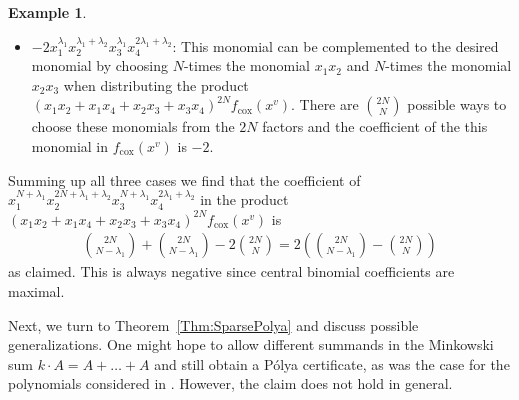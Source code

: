 \documentclass[a4paper,11pt]{amsart}
\theoremstyle{definition}
\newtheorem{example}[theorem]{Example}
\newcommand{\cox}{\mathrm{cox}}
\begin{document}
\begin{example}
\begin{itemize}
    \item {$- 2 x_1^{\lambda_1}x_2^{\lambda_1 + \lambda_2}x_3^{\lambda_1}x_4^{2\lambda_1 + \lambda_2}$:} This monomial can be complemented to the desired monomial by choosing $N$-times the monomial $x_1x_2$ and $N$-times the monomial $x_2x_3$ when distributing the product $(x_1x_2+x_1x_4+x_2x_3+x_3x_4)^{2N}f_\cox(x^v)$. There are $\binom{2N}{N}$ possible ways to choose these monomials from the $2N$ factors and the coefficient of the this monomial in $f_\cox(x^v)$ is $-2$.
\end{itemize}
Summing up all three cases we find that the coefficient of $x_1^{N+\lambda_1}x_2^{2N+\lambda_1+\lambda_2}x_3^{N+\lambda_1}x_4^{2\lambda_1+\lambda_2}$ in the product $(x_1x_2+x_1x_4+x_2x_3+x_3x_4)^{2N}f_\cox(x^v)$ is \begin{align*}
    \binom{2N}{N-\lambda_1}+\binom{2N}{N-\lambda_1}-2\binom{2N}{N}= 2\left(\binom{2N}{N-\lambda_1}-\binom{2N}{N}\right)
\end{align*}
as claimed. This is always negative since central binomial coefficients are maximal.
\end{example}

Next, we turn to Theorem~\ref{Thm:SparsePolya} and discuss possible generalizations. One might hope to allow different summands in the Minkowski sum $k\cdot A = A + \dots + A$ and still obtain a Pólya certificate, as was the case for the polynomials considered in \cite[Theorem 6.1]{SturmfelsTelek}. However, the claim does not hold in general.
\end{document}
